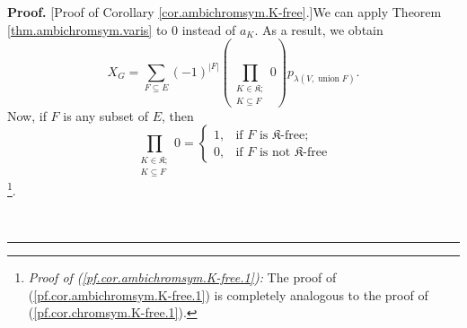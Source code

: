 \documentclass[numbers=enddot,12pt,final,onecolumn,notitlepage]{scrartcl}%
\theoremstyle{definition}
\newenvironment{proof}[1][Proof]{\noindent\textbf{#1.} }{\ \rule{0.5em}{0.5em}}
\newenvironment{verlong}{}{}
\let\sumnonlimits\sum
\let\prodnonlimits\prod
\renewcommand{\sum}{\sumnonlimits\limits}
\renewcommand{\prod}{\prodnonlimits\limits}
\begin{document}
\begin{verlong}
\begin{proof}
[Proof of Corollary \ref{cor.ambichromsym.K-free}.]We can apply Theorem
\ref{thm.ambichromsym.varis} to $0$ instead of $a_{K}$. As a result, we obtain%
\begin{equation}
X_{G}=\sum_{F\subseteq E}\left(  -1\right)  ^{\left\vert F\right\vert }\left(
\prod_{\substack{K\in\mathfrak{K};\\K\subseteq F}}0\right)  p_{\lambda\left(
V,\operatorname*{union}F\right)  }. \label{pf.cor.ambichromsym.K-free.0}%
\end{equation}
Now, if $F$ is any subset of $E$, then%
\begin{equation}
\prod_{\substack{K\in\mathfrak{K};\\K\subseteq F}}0=%
\begin{cases}
1, & \text{if }F\text{ is }\mathfrak{K}\text{-free;}\\
0, & \text{if }F\text{ is not }\mathfrak{K}\text{-free}%
\end{cases}
\label{pf.cor.ambichromsym.K-free.1}%
\end{equation}
\footnote{\textit{Proof of (\ref{pf.cor.ambichromsym.K-free.1}):} The proof of
(\ref{pf.cor.ambichromsym.K-free.1}) is completely analogous to the proof of
(\ref{pf.cor.chromsym.K-free.1}).}.


\end{proof}
\end{verlong}
\end{document}
